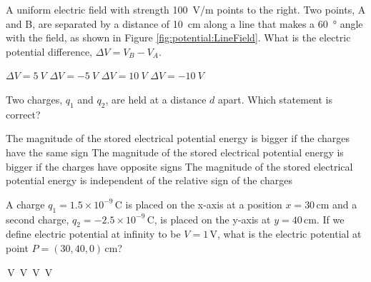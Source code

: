 \question A uniform electric field with strength \SI{100}{V/m} points to the right. Two points, A and B, are separated by a distance of \SI{10}{cm} along a line that makes a \SI{60}{\degree} angle with the field, as shown in Figure \ref{fig:potential:LineField}. What is the  electric potential difference, $\Delta V=V_B-V_A$.
\begin{choices} 
\choice $\Delta V=\SI{5}{V}$
\CorrectChoice  $\Delta V=\SI{-5}{V}$ \correct
\choice $\Delta V=\SI{10}{V}$
\choice $\Delta V=\SI{-10}{V}$
\end{choices}

\question Two charges, $q_1$ and $q_2$, are held at a distance $d$ apart. Which statement is correct?
\begin{checkboxes}
\choice The magnitude of the stored electrical potential energy is bigger if the charges have the same sign 
\choice The magnitude of the stored electrical potential energy is bigger if the charges have opposite signs
\CorrectChoice  The magnitude of the stored electrical potential energy is independent of the relative sign of the charges \correct
\end{checkboxes}

\question A charge $q_1=1.5\times 10^{-9}$\,C is placed on the x-axis at a position $x=30$\,cm and a second charge, $q_2=-2.5\times 10^{-9}$\,C, is placed on the y-axis at $y=40$\,cm. If we define electric potential at infinity to be $V=1$\,V, what is the electric potential at point $P=(30,40,0)$\,cm?
\begin{checkboxes}
\,V
\,V \correct
{}\,V
\,V
\end{checkboxes}

%
%

